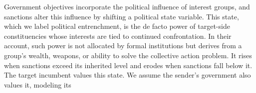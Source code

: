  Government objectives
incorporate the political influence of interest groups, and sanctions alter this
influence by shifting a political state variable. This state, which we label
political entrenchment, is the de facto power
\citep[in the sense of][p.~268]{AcemogluRobinson2008} of target-side constituencies
whose interests are tied to continued confrontation. In their account, such power is not
allocated by formal institutions but derives from a group's wealth, weapons, or
ability to solve the collective action problem. It rises when sanctions exceed
its inherited level and erodes when sanctions fall below it. The target incumbent
values this state. We assume the sender's government also values it, modeling its
